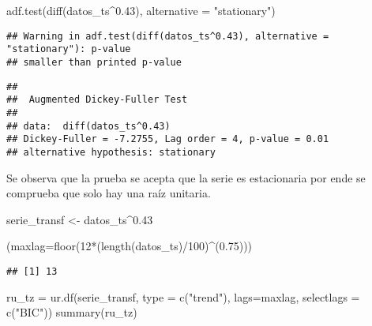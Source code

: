 \documentclass[
]{article}
\newenvironment{Shaded}{\begin{snugshade}}{\end{snugshade}}
\newcommand{\AttributeTok}[1]{\textcolor[rgb]{0.77,0.63,0.00}{#1}}
\newcommand{\DecValTok}[1]{\textcolor[rgb]{0.00,0.00,0.81}{#1}}
\newcommand{\FloatTok}[1]{\textcolor[rgb]{0.00,0.00,0.81}{#1}}
\newcommand{\FunctionTok}[1]{\textcolor[rgb]{0.00,0.00,0.00}{#1}}
\newcommand{\NormalTok}[1]{#1}
\newcommand{\OtherTok}[1]{\textcolor[rgb]{0.56,0.35,0.01}{#1}}
\newcommand{\SpecialCharTok}[1]{\textcolor[rgb]{0.00,0.00,0.00}{#1}}
\newcommand{\StringTok}[1]{\textcolor[rgb]{0.31,0.60,0.02}{#1}}
\begin{document}
\begin{Shaded}
\begin{Highlighting}[]
\FunctionTok{adf.test}\NormalTok{(}\FunctionTok{diff}\NormalTok{(datos\_ts}\SpecialCharTok{\^{}}\FloatTok{0.43}\NormalTok{), }\AttributeTok{alternative =} \StringTok{"stationary"}\NormalTok{)}
\end{Highlighting}
\end{Shaded}

\begin{verbatim}
## Warning in adf.test(diff(datos_ts^0.43), alternative = "stationary"): p-value
## smaller than printed p-value
\end{verbatim}

\begin{verbatim}
## 
##  Augmented Dickey-Fuller Test
## 
## data:  diff(datos_ts^0.43)
## Dickey-Fuller = -7.2755, Lag order = 4, p-value = 0.01
## alternative hypothesis: stationary
\end{verbatim}

Se observa que la prueba se acepta que la serie es estacionaria por ende
se comprueba que solo hay una raíz unitaria.

\begin{Shaded}
\begin{Highlighting}[]
\NormalTok{serie\_transf }\OtherTok{\textless{}{-}}\NormalTok{ datos\_ts}\SpecialCharTok{\^{}}\FloatTok{0.43}

\NormalTok{(}\AttributeTok{maxlag=}\FunctionTok{floor}\NormalTok{(}\DecValTok{12}\SpecialCharTok{*}\NormalTok{(}\FunctionTok{length}\NormalTok{(datos\_ts)}\SpecialCharTok{/}\DecValTok{100}\NormalTok{)}\SpecialCharTok{\^{}}\NormalTok{(}\FloatTok{0.75}\NormalTok{)))}
\end{Highlighting}
\end{Shaded}

\begin{verbatim}
## [1] 13
\end{verbatim}

\begin{Shaded}
\begin{Highlighting}[]
\NormalTok{ru\_tz }\OtherTok{=} \FunctionTok{ur.df}\NormalTok{(serie\_transf, }\AttributeTok{type =} \FunctionTok{c}\NormalTok{(}\StringTok{"trend"}\NormalTok{), }\AttributeTok{lags=}\NormalTok{maxlag, }\AttributeTok{selectlags =} \FunctionTok{c}\NormalTok{(}\StringTok{"BIC"}\NormalTok{))}
\FunctionTok{summary}\NormalTok{(ru\_tz)}
\end{Highlighting}
\end{Shaded}
\end{document}
